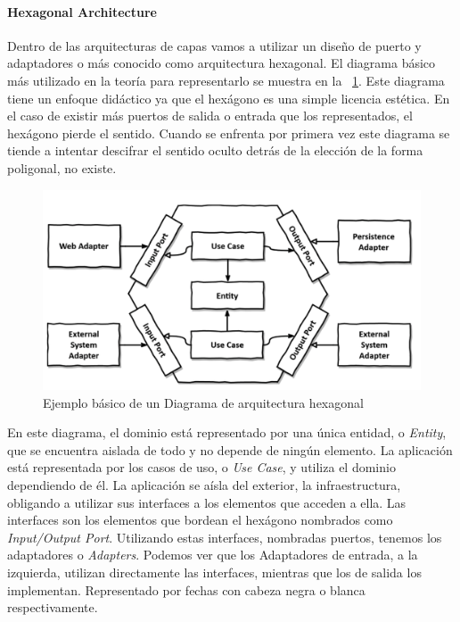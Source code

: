 
\paragraph{Hexagonal Architecture}

Dentro de las arquitecturas de capas vamos a utilizar un diseño de puerto y adaptadores o más conocido como arquitectura hexagonal.
El diagrama básico más utilizado en la teoría para representarlo se muestra en la ~\cref{fig:hexagonalDiagram}.
Este diagrama tiene un enfoque didáctico ya que el hexágono es una simple licencia estética.
En el caso de existir más puertos de salida o entrada que los representados, el hexágono pierde el sentido.
Cuando se enfrenta por primera vez este diagrama se tiende a intentar descifrar el sentido oculto detrás de la elección de la forma poligonal, no existe.

\begin{figure}[H]
    \centering
    \includegraphics[height=0.22\textheight]{./part/Ejecucion/Seguimiento/CreateTaskUseCase/img/HexagonalDiagram}
    \caption{Ejemplo básico de un Diagrama de arquitectura hexagonal\cite{TomHombergs2019GYHD}}\label{fig:hexagonalDiagram}
\end{figure}

En este diagrama, el dominio está representado por una única entidad, o \textit{Entity}, que se encuentra aislada de todo y no depende de ningún elemento.
La aplicación está representada por los casos de uso, o \textit{Use Case}, y utiliza el dominio dependiendo de él.
La aplicación se aísla del exterior, la infraestructura, obligando a utilizar sus interfaces a los elementos que acceden a ella.
Las interfaces son los elementos que bordean el hexágono nombrados como \textit{Input/Output Port}.
Utilizando estas interfaces, nombradas puertos, tenemos los adaptadores o \textit{Adapters}.
Podemos ver que los Adaptadores de entrada, a la izquierda, utilizan directamente las interfaces, mientras que los de salida los implementan.
Representado por fechas con cabeza negra o blanca respectivamente.

